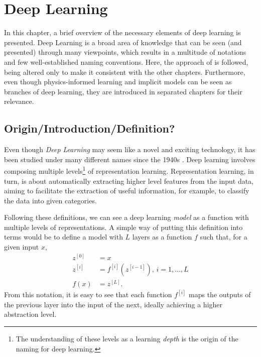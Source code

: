 \chapter{Deep Learning}\label{cap:deep-learning}

In this chapter, a brief overview of the necessary elements of deep learning is presented.
Deep Learning is a broad area of knowledge that can be seen (and presented) through many viewpoints, which results in a multitude of notations and few well-established naming conventions.
Here, the approach of \textcite{goodfellow_deep_2016} is followed, being altered only to make it consistent with the other chapters.
Furthermore, even though physics-informed learning and implicit models can be seen as branches of deep learning, they are introduced in separated chapters for their relevance.

\section{Origin/Introduction/Definition?}

Even though \textit{Deep Learning} may seem like a novel and exciting technology, it has been studied under many different names since the 1940s \cite{goodfellow_deep_2016}.
Deep learning involves composing multiple levels\footnote{The understanding of these levels as a learning \textit{depth} is the origin of the naming for deep learning.} of representation learning.
Representation learning, in turn, is about automatically extracting higher level features from the input data\cite{lecun_deep_2015,bengio_representation_2013}, aiming to facilitate the extraction of useful information, for example, to classify the data into given categories.

Following these definitions, we can see a deep learning \textit{model} as a function with multiple levels of representations.
A simple way of putting this definition into terms would be to define a model with $L$ layers as a function $f$ such that, for a given input $x$,
\begin{align*}
    z^{[0]} &= x \\
    z^{[i]} &= f^{[i]}(z^{[i-1]}),\,i=1,\ldots,L \\
    f(x) &= z^{[L]}
.\end{align*}
From this notation, it is easy to see that each function $f^{[i]}$ maps the outputs of the previous layer into the input of the next, ideally achieving a higher abstraction level.

